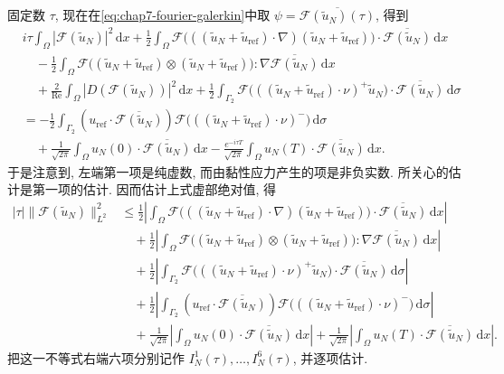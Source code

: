 \begin{sloppypar}
\begin{Proof}
固定数 $\tau$, 现在在\eqref{eq:chap7-fourier-galerkin}中取
$\psi=\overline{\mathcal F(\widetilde u_N)(\tau)}$, 得到
\[
\begin{aligned}
 &i\tau\int_\Omega|\mathcal F(\widetilde u_N)|^2\,\mathrm dx
 +\frac12\int_\Omega\mathcal F\bigl(((\widetilde u_N+\widetilde u_{\mathrm{ref}})\cdot\nabla)
 (\widetilde u_N+\widetilde u_{\mathrm{ref}})\bigr)\cdot
 \overline{\mathcal F(\widetilde u_N)}\,\mathrm dx\\
 &\quad-\frac12\int_\Omega\mathcal F\bigl((\widetilde u_N+\widetilde u_{\mathrm{ref}})
 \otimes(\widetilde u_N+\widetilde u_{\mathrm{ref}})\bigr):
 \nabla\overline{\mathcal F(\widetilde u_N)}\,\mathrm dx\\
 &\quad+\frac2{\operatorname{Re}}\int_\Omega
 |D(\mathcal F(\widetilde u_N))|^2\,\mathrm dx
 +\frac12\int_{\Gamma_2}\mathcal F\bigl(((\widetilde u_N+\widetilde u_{\mathrm{ref}})\cdot\nu)^+
 \widetilde u_N\bigr)\cdot\overline{\mathcal F(\widetilde u_N)}\,\mathrm d\sigma\\
 &=-\frac12\int_{\Gamma_2}(u_{\mathrm{ref}}\cdot\overline{\mathcal F(\widetilde u_N)})
 \mathcal F\bigl(((\widetilde u_N+\widetilde u_{\mathrm{ref}})\cdot\nu)^-\bigr)\,\mathrm d\sigma\\
 &\quad+\frac1{\sqrt{2\pi}}\int_\Omega u_N(0)\cdot
 \overline{\mathcal F(\widetilde u_N)}\,\mathrm dx
 -\frac{e^{-i\tau T}}{\sqrt{2\pi}}\int_\Omega u_N(T)\cdot
 \overline{\mathcal F(\widetilde u_N)}\,\mathrm dx.
\end{aligned}
\]
于是注意到, 左端第一项是纯虚数, 而由黏性应力产生的项是非负实数. 所关心的估计是第一项的估计. 因而估计上式虚部绝对值, 得
\begin{equation}
\begin{aligned}
 |\tau|\|\mathcal F(\widetilde u_N)\|_{L^2}^2
 &\leq\frac12\left|\int_\Omega\mathcal F\bigl(((\widetilde u_N+\widetilde u_{\mathrm{ref}})\cdot\nabla)
 (\widetilde u_N+\widetilde u_{\mathrm{ref}})\bigr)\cdot
 \overline{\mathcal F(\widetilde u_N)}\,\mathrm dx\right|\\
 &\quad+\frac12\left|\int_\Omega\mathcal F\bigl((\widetilde u_N+\widetilde u_{\mathrm{ref}})
 \otimes(\widetilde u_N+\widetilde u_{\mathrm{ref}})\bigr):
 \nabla\overline{\mathcal F(\widetilde u_N)}\,\mathrm dx\right|\\
 &\quad+\frac12\left|\int_{\Gamma_2}\mathcal F\bigl(((\widetilde u_N+\widetilde u_{\mathrm{ref}})\cdot\nu)^+
 \widetilde u_N\bigr)\cdot\overline{\mathcal F(\widetilde u_N)}\,\mathrm d\sigma\right|\\
 &\quad+\frac12\left|\int_{\Gamma_2}(u_{\mathrm{ref}}\cdot\overline{\mathcal F(\widetilde u_N)})
 \mathcal F\bigl(((\widetilde u_N+\widetilde u_{\mathrm{ref}})\cdot\nu)^-\bigr)\,\mathrm d\sigma\right|\\
 &\quad+\frac1{\sqrt{2\pi}}\left|\int_\Omega u_N(0)\cdot
 \overline{\mathcal F(\widetilde u_N)}\,\mathrm dx\right|
 +\frac1{\sqrt{2\pi}}\left|\int_\Omega u_N(T)\cdot
 \overline{\mathcal F(\widetilde u_N)}\,\mathrm dx\right|.
\end{aligned}
\label{eq:chap7-fourier-imaginary-bound}
\end{equation}
把这一不等式右端六项分别记作 $I_N^1(\tau),\ldots,I_N^6(\tau)$, 并逐项估计.


\end{Proof}
\end{sloppypar}
